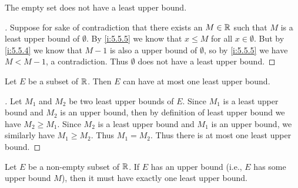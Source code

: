 \setcounter{thm}{6}
\begin{eg}\label{i:5.5.7}
  The empty set does not have a least upper bound.
\end{eg}

\begin{proof}[]
  Suppose for sake of contradiction that there exists an \(M \in \mathbb{R}\) such that \(M\) is a least upper bound of \(\emptyset\).
  By \cref{i:5.5.5} we know that \(x \leq M\) for all \(x \in \emptyset\).
  But by \cref{i:5.5.4} we know that \(M - 1\) is also a upper bound of \(\emptyset\), so by \cref{i:5.5.5} we have \(M < M - 1\), a contradiction.
  Thus \(\emptyset\) does not have a least upper bound.
\end{proof}

\begin{prop}\label{i:5.5.8}
  Let \(E\) be a subset of \(\mathbb{R}\).
  Then \(E\) can have at most one least upper bound.
\end{prop}

\begin{proof}[]
  Let \(M_1\) and \(M_2\) be two least upper bounds of \(E\).
  Since \(M_1\) is a least upper bound and \(M_2\) is an upper bound, then by definition of least upper bound we have \(M_2 \geq M_1\).
  Since \(M_2\) is a least upper bound and \(M_1\) is an upper bound, we similarly have \(M_1 \geq M_2\).
  Thus \(M_1 = M_2\).
  Thus there is at most one least upper bound.
\end{proof}

\begin{thm}\label{i:5.5.9}
  Let \(E\) be a non-empty subset of \(\mathbb{R}\).
  If \(E\) has an upper bound (i.e., \(E\) has some upper bound \(M\)), then it must have exactly one least upper bound.
\end{thm}

